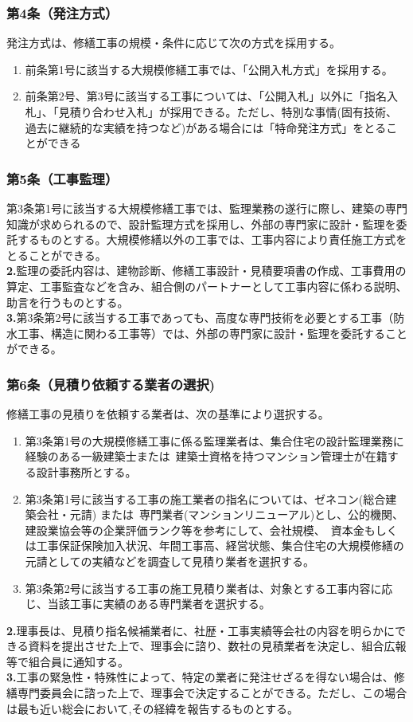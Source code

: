 \documentclass[12pt,uplatex]{jsarticle}
\begin{document}
\subsubsection*{ 第4条（発注方式）}
発注方式は、修繕工事の規模・条件に応じて次の方式を採用する。\
\begin{enumerate}
    \item 前条第1号に該当する大規模修繕工事では、「公開入札方式」を採用する。
    \item 前条第2号、第3号に該当する工事については、「公開入札」以外に「指名入札」、「見積り合わせ入札」が採用できる。ただし、特別な事情(固有技術、過去に継続的な実績を持つなど)がある場合には「特命発注方式」をとることができる
\end{enumerate}
\subsubsection*{ 第5条（工事監理）}
第3条第1号に該当する大規模修繕工事では、監理業務の遂行に際し、建築の専門知識が求められるので、設計監理方式を採用し、外部の専門家に設計・監理を委託するものとする。大規模修繕以外の工事では、工事内容により責任施工方式をとることができる。\\
\textbf{2.}監理の委託内容は、建物診断、修繕工事設計・見積要項書の作成、工事費用の算定、工事監査などを含み、組合側のパートナーとして工事内容に係わる説明、助言を行うものとする。\\
\textbf{3.}第3条第2号に該当する工事であっても、高度な専門技術を必要とする工事（防水工事、構造に関わる工事等）では、外部の専門家に設計・監理を委託することができる。
\subsubsection*{ 第6条（見積り依頼する業者の選択)}
修繕工事の見積りを依頼する業者は、次の基準により選択する。
\begin{enumerate}
  \item 第3条第1号の大規模修繕工事に係る監理業者は、集合住宅の設計監理業務に経験のある一級建築士または\
 建築士資格を持つマンション管理士が在籍する設計事務所とする。
  \item 第3条第1号に該当する工事の施工業者の指名については、ゼネコン(総合建築会社・元請) または\
 専門業者(マンションリニューアル)とし、公的機関、建設業協会等の企業評価ランク等を参考にして、会社規模、\
 資本金もしくは工事保証保険加入状況、年間工事高、経営状態、集合住宅の大規模修繕の元請としての実績などを調査して見積り業者を選択する。
  \item 第3条第2号に該当する工事の施工見積り業者は、対象とする工事内容に応じ、当該工事に実績のある専門業者を選択する。
\end{enumerate}
\textbf{2.}理事長は、見積り指名候補業者に、社歴・工事実績等会社の内容を明らかにできる資料を提出させた上で、理事会に諮り、数社の見積業者を決定し、組合広報等で組合員に通知する。\\
\textbf{3.}工事の緊急性・特殊性によって、特定の業者に発注せざるを得ない場合は、修繕専門委員会に諮った上で、理事会で決定することができる。ただし、この場合は最も近い総会において,その経緯を報告するものとする。
\end{document}
